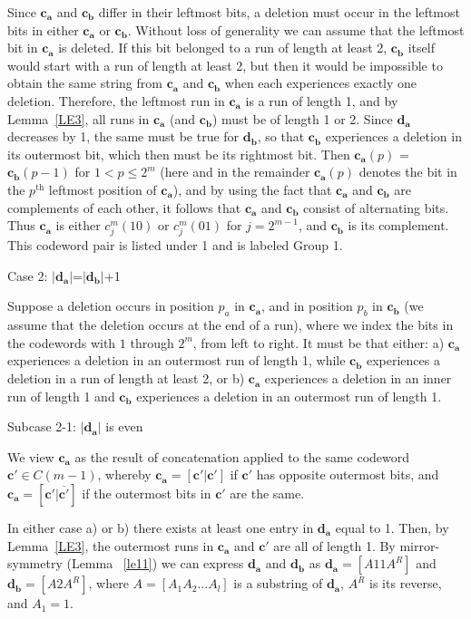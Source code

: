 Since $\mathbf{c_a}$ and $\mathbf{c_b}$ differ in
their leftmost bits, a deletion must occur in the leftmost bits in
either $\mathbf{c_a}$ or $\mathbf{c_b}$.
Without loss of generality we can assume that the leftmost bit in
$\mathbf{c_a}$ is deleted. If this bit belonged to a run of length
at least 2, $\mathbf{c_b}$ itself would start with a run of length
at least 2, but then it would be impossible to obtain the same
string from $\mathbf{c_a}$ and $\mathbf{c_b}$ when each
experiences exactly one deletion. Therefore, the leftmost run in
$\mathbf{c_a}$ is a run of length 1, and by Lemma~\ref{LE3}, all
runs in $\mathbf{c_a}$ (and $\mathbf{c_b}$) must be of length 1 or
2. Since $\mathbf{d_a}$ decreases by 1, the same must be true for
$\mathbf{d_b}$, so that $\mathbf{c_b}$ experiences a deletion in
its outermost bit, which then must be its rightmost bit. Then
$\mathbf{c_a}(p)$ = $\mathbf{c_b}(p-1)$ for $1<p \leq 2^{m}$ (here
and in the remainder $\mathbf{c_a}(p)$ denotes the bit in the
$p^{\text{th}}$ leftmost position of $\mathbf{c_a}$), and by using
the fact that $\mathbf{c_a}$ and $\mathbf{c_b}$ are complements of
each other, it follows that $\mathbf{c_a}$ and $\mathbf{c_b}$
consist of alternating bits. Thus $\mathbf{c_a}$ is either
$c_j^m(10)$ or $c_j^m(01)$ for $j=2^{m-1}$, and $\mathbf{c_b}$ is
its complement. This codeword pair is listed under 1 and is
labeled Group 1.

Case 2: $|\mathbf{d_a}|$=$|\mathbf{d_b}|$+1

Suppose a deletion occurs in position $p_a$ in $\mathbf{c_a}$, and
in position $p_b$ in $\mathbf{c_b}$ (we assume that the deletion
occurs at the end of a run), where we index the bits in the
codewords with $1$ through $2^m$, from left to right. It must be
that either: a) $\mathbf{c_a}$ experiences a deletion in an
outermost run of length 1, while $\mathbf{c_b}$ experiences a
deletion in a run of length at least 2, or b) $\mathbf{c_a}$
experiences a deletion in an inner run of length 1 and
$\mathbf{c_b}$ experiences a deletion in an outermost run of length
1.

Subcase 2-1: $|\mathbf{d_a}|$ is even

We view $\mathbf{c_a}$ as the result of
concatenation applied to the same codeword $\mathbf{c'} \in
C(m-1)$, whereby $\mathbf{c_a}= [ \mathbf{c'} | \mathbf{c'}]$
if $\mathbf{c'}$ has opposite outermost bits,
and $\mathbf{c_a}= [ \mathbf{c'} | \overline{\mathbf{c'}}]$
if the outermost bits in $\mathbf{c'}$ are the same.

In either case a) or b) there exists at least one entry in
$\mathbf{d_a}$ equal to 1. Then, by Lemma~\ref{LE3}, the outermost
runs in $\mathbf{c_a}$ and $\mathbf{c'}$ are all of length 1. By
mirror-symmetry (Lemma ~\ref{le11}) we can express $\mathbf{d_a}$
and $\mathbf{d_b}$ as $\mathbf{d_a}=[A11A^R]$ and
$\mathbf{d_b}=[A2A^R]$, where $A=[A_1 A_2 ... A_l]$ is a substring
of $\mathbf{d_a}$, $A^R$ is its reverse, and $A_1=1$.

